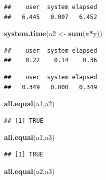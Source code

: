 \documentclass[]{book}
\newenvironment{Shaded}{\begin{snugshade}}{\end{snugshade}}
\newcommand{\KeywordTok}[1]{\textcolor[rgb]{0.13,0.29,0.53}{\textbf{#1}}}
\newcommand{\StringTok}[1]{\textcolor[rgb]{0.31,0.60,0.02}{#1}}
\newcommand{\OperatorTok}[1]{\textcolor[rgb]{0.81,0.36,0.00}{\textbf{#1}}}
\newcommand{\NormalTok}[1]{#1}
\theoremstyle{definition}
\theoremstyle{definition}
\theoremstyle{definition}
\theoremstyle{remark}
\begin{document}
\begin{verbatim}
##    user  system elapsed 
##   6.445   0.007   6.452
\end{verbatim}

\begin{Shaded}
\begin{Highlighting}[]
\KeywordTok{system.time}\NormalTok{(a2 <-}\StringTok{ }\KeywordTok{sum}\NormalTok{(x}\OperatorTok{*}\NormalTok{y))}
\end{Highlighting}
\end{Shaded}

\begin{verbatim}
##    user  system elapsed 
##    0.22    0.14    0.36
\end{verbatim}

\begin{Shaded}
\end{Shaded}

\begin{verbatim}
##    user  system elapsed 
##   0.349   0.000   0.349
\end{verbatim}

\begin{Shaded}
\begin{Highlighting}[]
\KeywordTok{all.equal}\NormalTok{(a1,a2)}
\end{Highlighting}
\end{Shaded}

\begin{verbatim}
## [1] TRUE
\end{verbatim}

\begin{Shaded}
\begin{Highlighting}[]
\KeywordTok{all.equal}\NormalTok{(a1,a3)}
\end{Highlighting}
\end{Shaded}

\begin{verbatim}
## [1] TRUE
\end{verbatim}

\begin{Shaded}
\begin{Highlighting}[]
\KeywordTok{all.equal}\NormalTok{(a2,a3)}
\end{Highlighting}
\end{Shaded}
\end{document}

